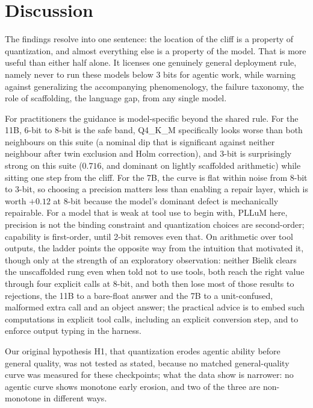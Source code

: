 \documentclass[11pt]{article}
\begin{document}
\section{Discussion}
\label{sec:discussion}

The findings resolve into one sentence: the location of the cliff is a property of quantization, and almost everything else is a property of the model. That is more useful than either half alone. It licenses one genuinely general deployment rule, namely never to run these models below 3 bits for agentic work, while warning against generalizing the accompanying phenomenology, the failure taxonomy, the role of scaffolding, the language gap, from any single model.

For practitioners the guidance is model-specific beyond the shared rule. For the 11B, 6-bit to 8-bit is the safe band, Q4\_K\_M specifically looks worse than both neighbours on this suite (a nominal dip that is significant against neither neighbour after twin exclusion and Holm correction), and 3-bit is surprisingly strong on this suite ($0.716$, and dominant on lightly scaffolded arithmetic) while sitting one step from the cliff. For the 7B, the curve is flat within noise from 8-bit to 3-bit, so choosing a precision matters less than enabling a repair layer, which is worth $+0.12$ at 8-bit because the model's dominant defect is mechanically repairable. For a model that is weak at tool use to begin with, PLLuM here, precision is not the binding constraint and quantization choices are second-order; capability is first-order, until 2-bit removes even that. On arithmetic over tool outputs, the ladder points the opposite way from the intuition that motivated it, though only at the strength of an exploratory observation: neither Bielik clears the unscaffolded rung even when told not to use tools, both reach the right value through four explicit calls at 8-bit, and both then lose most of those results to rejections, the 11B to a bare-float answer and the 7B to a unit-confused, malformed extra call and an object answer; the practical advice is to embed such computations in explicit tool calls, including an explicit conversion step, and to enforce output typing in the harness.

Our original hypothesis H1, that quantization erodes agentic ability before general quality, was not tested as stated, because no matched general-quality curve was measured for these checkpoints; what the data show is narrower: no agentic curve shows monotone early erosion, and two of the three are non-monotone in different ways.
\end{document}
